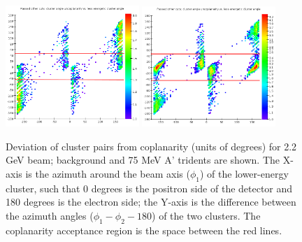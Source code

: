 \begin{figure}[ht]
	\includegraphics[width=0.45\textwidth]{performance/trigger/coplanarity_22}
	\includegraphics[width=0.45\textwidth]{performance/trigger/coplanarity_22_075mev}
	\caption{\small{Deviation of cluster pairs from coplanarity (units of degrees) for 2.2 GeV beam; background and 75 MeV A' tridents are shown. The X-axis is the azimuth around the beam axis ($\phi_1$) of the lower-energy cluster, such that 0 degrees is the positron side of the detector and 180 degrees is the electron side; the Y-axis is the difference between the azimuth angles ($\phi_1-\phi_2 - 180$) of the two clusters. The coplanarity acceptance region is the space between the red lines.}}
	\label{fig:coplanarity}
\end{figure}

